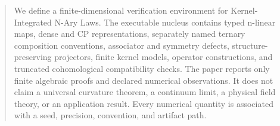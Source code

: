 \begin{abstract}
We define a finite-dimensional verification environment for Kernel-Integrated N-Ary Laws. The executable nucleus contains typed n-linear maps, dense and CP representations, separately named ternary composition conventions, associator and symmetry defects, structure-preserving projectors, finite kernel models, operator constructions, and truncated cohomological compatibility checks. The paper reports only finite algebraic proofs and declared numerical observations. It does not claim a universal curvature theorem, a continuum limit, a physical field theory, or an application result. Every numerical quantity is associated with a seed, precision, convention, and artifact path.
\end{abstract}


